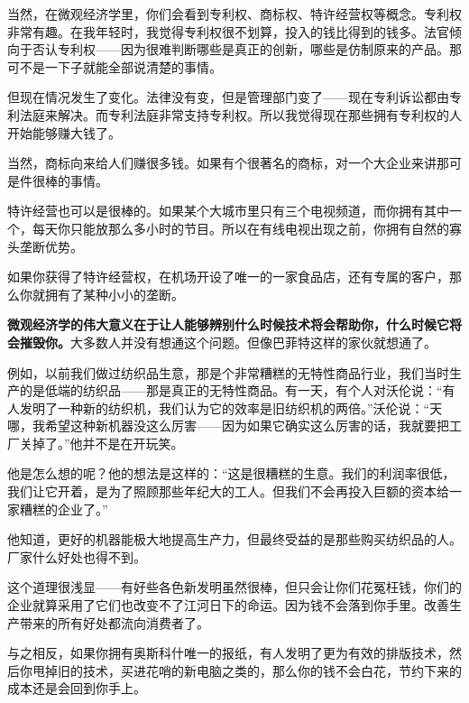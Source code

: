 当然，在微观经济学里，你们会看到专利权、商标权、特许经营权等概念。专利权非常有趣。在我年轻时，我觉得专利权很不划算，投入的钱比得到的钱多。法官倾向于否认专利权——因为很难判断哪些是真正的创新，哪些是仿制原来的产品。那可不是一下子就能全部说清楚的事情。
\par

但现在情况发生了变化。法律没有变，但是管理部门变了——现在专利诉讼都由专利法庭来解决。而专利法庭非常支持专利权。所以我觉得现在那些拥有专利权的人开始能够赚大钱了。
\par

当然，商标向来给人们赚很多钱。如果有个很著名的商标，对一个大企业来讲那可是件很棒的事情。
\par

特许经营也可以是很棒的。如果某个大城市里只有三个电视频道，而你拥有其中一个，每天你只能放那么多小时的节目。所以在有线电视出现之前，你拥有自然的寡头垄断优势。
\par

如果你获得了特许经营权，在机场开设了唯一的一家食品店，还有专属的客户，那么你就拥有了某种小小的垄断。
\par

\textbf{微观经济学的伟大意义在于让人能够辨别什么时候技术将会帮助你，什么时候它将会摧毁你。}大多数人并没有想通这个问题。但像巴菲特这样的家伙就想通了。
\par

例如，以前我们做过纺织品生意，那是个非常糟糕的无特性商品行业，我们当时生产的是低端的纺织品——那是真正的无特性商品。有一天，有个人对沃伦说：“有人发明了一种新的纺织机，我们认为它的效率是旧纺织机的两倍。”沃伦说：“天哪，我希望这种新机器没这么厉害——因为如果它确实这么厉害的话，我就要把工厂关掉了。”他并不是在开玩笑。
\par

他是怎么想的呢？他的想法是这样的：“这是很糟糕的生意。我们的利润率很低，我们让它开着，是为了照顾那些年纪大的工人。但我们不会再投入巨额的资本给一家糟糕的企业了。”
\par

他知道，更好的机器能极大地提高生产力，但最终受益的是那些购买纺织品的人。厂家什么好处也得不到。
\par

这个道理很浅显——有好些各色新发明虽然很棒，但只会让你们花冤枉钱，你们的企业就算采用了它们也改变不了江河日下的命运。因为钱不会落到你手里。改善生产带来的所有好处都流向消费者了。
\par

与之相反，如果你拥有奥斯科什唯一的报纸，有人发明了更为有效的排版技术，然后你甩掉旧的技术，买进花哨的新电脑之类的，那么你的钱不会白花，节约下来的成本还是会回到你手上。
\par

